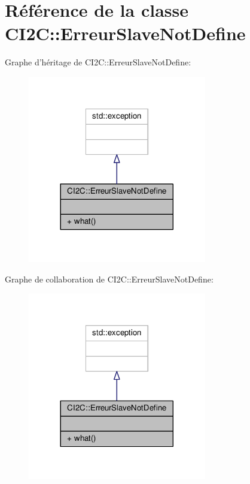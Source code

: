 \hypertarget{classCI2C_1_1ErreurSlaveNotDefine}{\section{Référence de la classe C\+I2\+C\+:\+:Erreur\+Slave\+Not\+Define}
\label{classCI2C_1_1ErreurSlaveNotDefine}
}


Graphe d'héritage de C\+I2\+C\+:\+:Erreur\+Slave\+Not\+Define\+:
\nopagebreak
\begin{figure}[H]
\begin{center}
\leavevmode
\includegraphics[width=221pt]{classCI2C_1_1ErreurSlaveNotDefine__inherit__graph}
\end{center}
\end{figure}


Graphe de collaboration de C\+I2\+C\+:\+:Erreur\+Slave\+Not\+Define\+:
\nopagebreak
\begin{figure}[H]
\begin{center}
\leavevmode
\includegraphics[width=221pt]{classCI2C_1_1ErreurSlaveNotDefine__coll__graph}
\end{center}
\end{figure}
